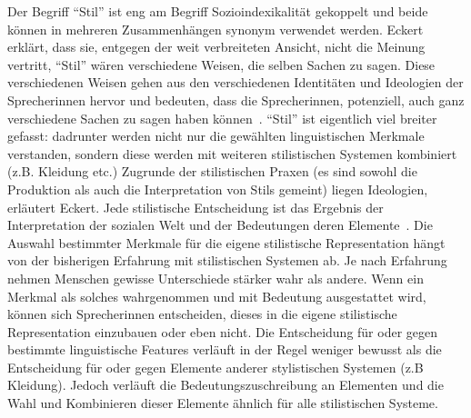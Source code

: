Der Begriff ``Stil'' ist eng am Begriff Sozioindexikalität gekoppelt und beide können in mehreren Zusammenhängen synonym verwendet werden.
Eckert erklärt, dass sie, entgegen der weit verbreiteten Ansicht, nicht die Meinung vertritt, ``Stil'' wären verschiedene Weisen, die selben Sachen zu sagen.
Diese verschiedenen Weisen gehen aus den verschiedenen Identitäten und Ideologien der Sprecherinnen hervor und bedeuten, dass die Sprecherinnen, potenziell, auch ganz verschiedene Sachen zu sagen haben können~\cite{Eckert08}. %
``Stil'' ist eigentlich viel breiter gefasst: dadrunter werden nicht nur die gewählten linguistischen Merkmale verstanden, sondern diese werden mit weiteren stilistischen Systemen kombiniert (z.B. Kleidung etc.)
Zugrunde der stilistischen Praxen (es sind sowohl die Produktion als auch die Interpretation von Stils gemeint) liegen Ideologien, erläutert Eckert.
Jede stilistische Entscheidung ist das Ergebnis der Interpretation der sozialen Welt und der Bedeutungen deren Elemente~\cite{Eckert08}. %
Die Auswahl bestimmter Merkmale für die eigene stilistische Representation hängt von der bisherigen Erfahrung mit stilistischen Systemen ab.
Je nach Erfahrung nehmen Menschen gewisse Unterschiede stärker wahr als andere.
Wenn ein Merkmal als solches wahrgenommen und mit Bedeutung ausgestattet wird, können sich Sprecherinnen entscheiden, dieses in die eigene stilistische Representation einzubauen oder eben nicht.
Die Entscheidung für oder gegen bestimmte linguistische Features verläuft in der Regel weniger bewusst als die Entscheidung für oder gegen Elemente anderer stylistischen Systemen (z.B Kleidung).
Jedoch verläuft die Bedeutungszuschreibung an Elementen und die Wahl und Kombinieren dieser Elemente ähnlich für alle stilistischen Systeme.

